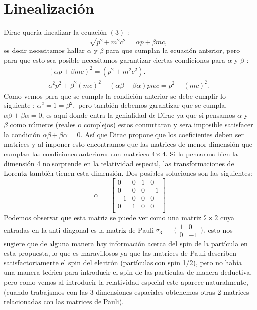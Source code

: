 \documentclass[twocolumn]{article}
\begin{document}
\section{Linealización}
Dirac quería linealizar la ecuación $(3)$ :
\begin{equation}
    \sqrt{p^2 + m^2c^2}=\alpha p+\beta mc ,
\end{equation}
 es decir necesitamos hallar $\alpha$ y $\beta$ para que cumplan la ecuación anterior, pero para que esto sea posible necesitamos garantizar ciertas condiciones para  $\alpha$ y $\beta$ :
\begin{gather}
    (\alpha p+\beta mc)^2 = (p^2 + m^2 c^2) . \\
    \alpha^2 p^2 + \beta ^2 (mc)^2 +(\alpha \beta +\beta \alpha)pmc = p^2 + (mc)^2 .
\end{gather}
Como vemos para que se cumpla la condición anterior se debe cumplir lo siguiente : $\alpha^2 = 1 = \beta^2 ,$ pero también debemos garantizar que se cumpla, $\alpha\beta +\beta \alpha=0$, es aquí donde entra la genialidad de Dirac ya que si pensamos $\alpha$ y $\beta$ como números (reales o complejos) estos conmutaran y sera imposible satisfacer la condición $\alpha \beta+\beta\alpha=0$. Así que Dirac propone que los coeficientes deben ser matrices y al imponer esto encontramos que las matrices de menor dimensión que cumplan las condiciones anteriores son matrices $4\times 4$. Si lo pensamos bien la dimensión 4 no sorprende en la relatividad especial, las transformaciones de Lorentz también tienen esta dimensión.
Dos posibles soluciones son las siguientes:
\begin{equation}
\begin{matrix}
\alpha=
\end{matrix}
\begin{bmatrix}
0 & 0 & 1 & 0 \\
0 & 0 & 0 & -1 \\
-1 & 0 & 0 & 0 \\
0 & 1 & 0 & 0 \\
\end{bmatrix}
\end{equation}
Podemos observar que esta matriz se puede ver como una matriz $2\times 2$ cuya entradas en la anti-diagonal es la matriz de Pauli $\sigma_3=$ $\big(\begin{smallmatrix}
  1 & 0\\
  0 & -1
\end{smallmatrix}\big),$
 esto nos sugiere que de alguna manera hay información acerca del spin de la partícula en esta propuesta, lo que es maravillosos ya que las matrices de Pauli describen satisfactoriamente el spin del electrón (partículas con spin 1/2), pero no había una manera teórica para introducir el spin de las partículas de manera deductiva, pero como vemos al introducir la relatividad especial este aparece naturalmente, (cuando trabajamos con las 3 dimensiones espaciales obtenemos otras 2 matrices relacionadas con las matrices de Pauli).
\end{document}
